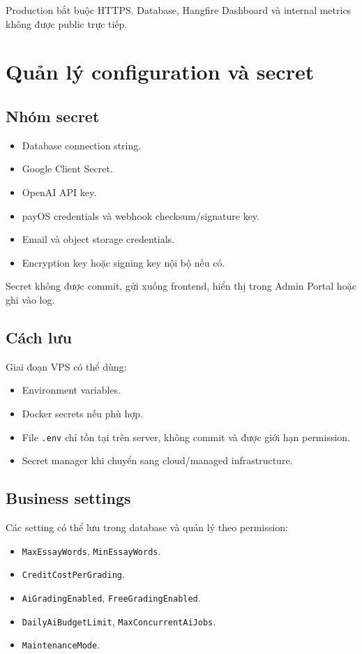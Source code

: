 \documentclass[11pt,a4paper]{article}
\newcommand{\code}[1]{\texttt{#1}}
\begin{document}
Production bắt buộc HTTPS. Database, Hangfire Dashboard và internal metrics không được public trực tiếp.

\section{Quản lý configuration và secret}

\subsection{Nhóm secret}

\begin{itemize}
  \item Database connection string.
  \item Google Client Secret.
  \item OpenAI API key.
  \item payOS credentials và webhook checksum/signature key.
  \item Email và object storage credentials.
  \item Encryption key hoặc signing key nội bộ nếu có.
\end{itemize}

Secret không được commit, gửi xuống frontend, hiển thị trong Admin Portal hoặc ghi vào log.

\subsection{Cách lưu}

Giai đoạn VPS có thể dùng:

\begin{itemize}
  \item Environment variables.
  \item Docker secrets nếu phù hợp.
  \item File \code{.env} chỉ tồn tại trên server, không commit và được giới hạn permission.
  \item Secret manager khi chuyển sang cloud/managed infrastructure.
\end{itemize}

\subsection{Business settings}

Các setting có thể lưu trong database và quản lý theo permission:

\begin{itemize}
  \item \code{MaxEssayWords}, \code{MinEssayWords}.
  \item \code{CreditCostPerGrading}.
  \item \code{AiGradingEnabled}, \code{FreeGradingEnabled}.
  \item \code{DailyAiBudgetLimit}, \code{MaxConcurrentAiJobs}.
  \item \code{MaintenanceMode}.
\end{itemize}
\end{document}
